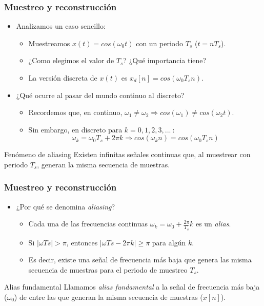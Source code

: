 \begin{frame}\frametitle{Muestreo y reconstrucción}
  \begin{itemize}
    \item \alert{Analizamos un caso sencillo:}
    \begin{itemize}
      \item<1-> Muestreamos $x(t)=cos(\omega_0 t)$ con un periodo $T_s$ (\color{blue}$t=nT_s$\color{black}).
      \item<2-> ¿Como elegimos el valor de $T_s$? ¿Qué importancia tiene?
      \item<3-> La versión discreta de $x(t)$ es \color{blue}$x_d[n]=cos(\omega_0 T_s n)$\color{black}.
    \end{itemize}
    \item \alert{¿Qué ocurre al pasar del mundo continuo al discreto?}
    \begin{itemize}
      \item Recordemos que, en continuo, $\omega_1\neq\omega_2 \Rightarrow cos(\omega_1 )\neq cos(\omega_2 t)$.
      \item Sin embargo, en discreto para $k=0,1,2,3,...~$:
      \color{blue}\[\omega_k = \omega_0 T_s + 2\pi k \Rightarrow cos(\omega_k n) = cos(\omega_0 T_s n)\]
    \end{itemize}
  \end{itemize}
  \begin{alertblock}{Fenómeno de aliasing}
    \centering Existen infinitas señales continuas que, al muestrear con periodo $T_s$, generan la misma secuencia de muestras.
  \end{alertblock}
\end{frame}

\begin{frame}\frametitle{Muestreo y reconstrucción}
  \begin{itemize}
    \item \alert{¿Por qué se denomina \emph{aliasing}?}
    \begin{itemize}
      \item<1-> Cada una de las frecuencias continuas \color{blue}$\omega_k=\omega_0 + \frac{2\pi}{T_s} k$ \color{black} es un \color{blue}\emph{alias}\color{black}.
      \item<2-> Si $|\omega Ts|> \pi$, entonces $|\omega Ts - 2\pi k|\geq\pi$ para algún $k$.
      \item<3-> Es decir, existe una señal de frecuencia más baja que genera las misma secuencia de muestras para el periodo de muestreo $T_s$.
    \end{itemize}
  \end{itemize}
  \begin{alertblock}{Alias fundamental}
    \centering Llamamos \color{blue}\emph{alias fundamental} \color{black}a la señal de frecuencia más baja ($\omega_0$) de entre las que generan la misma secuencia de muestras ($x[n]$).
  \end{alertblock}
\end{frame}

